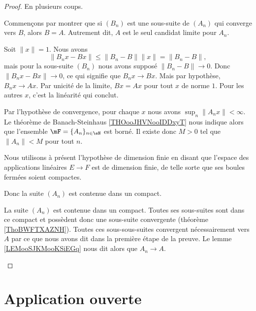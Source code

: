 \begin{proof}
	En plusieurs coups.
	\begin{subproof}
		Commençons par montrer que si \( (B_n)\) est une sous-suite de \( (A_n)\) qui converge vers \( B\), alors \( B=A\). Autrement dit, \( A\) est le seul candidat limite pour \( A_n\).

		Soit \( \| x \|=1\). Nous avons
		\begin{equation}
			\| B_nx-Bx \|\leq \| B_n-B \|\| x \|=\| B_n-B \|,
		\end{equation}
		mais pour la sous-suite \( (B_n)\) nous avons supposé \( \| B_n-B \|\to 0\). Donc \( \| B_nx-Bx \|\to 0\), ce qui signifie que \( B_nx\to Bx\). Mais par hypothèse, \( B_nx\to Ax\). Par unicité de la limite, \( Bx=Ax\) pour tout \( x\) de norme \( 1\). Pour les autres \( x\), c'est la linéarité qui conclut.

		Par l'hypothèse de convergence, pour chaque \( x\) nous avons \( \sup_n\| A_nx \|<\infty\). Le théorème de Banach-Steinhaus \ref{THOooJHVNooIDDxyT} nous indique alors que l'ensemble \( \mF=\{ A_n \}_{n\in \eN}\) est borné. Il existe donc \( M > 0\) tel que \( \| A_n \|< M\) pour tout \( n\).

		Nous utilisons à présent l'hypothèse de dimension finie en disant que l'espace des applications linéaires \( E\to F\) est de dimension finie, de telle sorte que ses boules fermées soient compactes.

		Donc la suite \( (A_n)\) est contenue dans un compact.

		La suite \( (A_n)\) est contenue dans un compact. Toutes ses sous-suites sont dans ce compact et possèdent donc une sous-suite convergente (théorème \ref{ThoBWFTXAZNH}). Toutes ces sous-sous-suites convergent nécessairement vers \( A\) par ce que nous avons dit dans la première étape de la preuve. Le lemme \ref{LEMooSJKMooKSiEGq} nous dit alors que \( A_n\to A\).
	\end{subproof}
\end{proof}


\section{Application ouverte}

